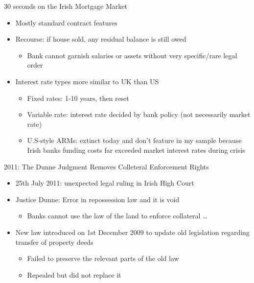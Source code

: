 \documentclass[ignorenonframetext,aspectratio=169]{beamer}
\providecommand{\tightlist}{%
  \setlength{\itemsep}{0pt}\setlength{\parskip}{0pt}}
\begin{document}
\begin{frame}{30 seconds on the Irish Mortgage Market}

\begin{itemize}
\item
  Mostly standard contract features
\item
  Recourse: if house sold, any residual balance is still owed

  \begin{itemize}
  \tightlist
  \item
    Bank cannot garnish salaries or assets without very specific/rare
    legal order
  \end{itemize}
\item
  Interest rate types more similar to UK than US

  \begin{itemize}
  \tightlist
  \item
    Fixed rates: 1-10 years, then reset
  \item
    Variable rate: interest rate decided by bank policy (not necessarily
    market rate)
  \item
    U.S-style ARMs: extinct today and don't feature in my sample because
    Irish banks funding costs far exceeded market interest rates during
    crisis
  \end{itemize}
\end{itemize}

\end{frame}

\begin{frame}{2011: The Dunne Judgment Removes Colleteral Enforcement
Rights}

\begin{itemize}
\item
  25th July 2011: unexpected legal ruling in Irish High Court
\item
  Justice Dunne: Error in repossession law and it is void

  \begin{itemize}
  \tightlist
  \item
    Banks cannot use the law of the land to enforce collateral \ldots{}
  \end{itemize}
\item
  New law introduced on 1st December 2009 to update old legislation
  regarding transfer of property deeds

  \begin{itemize}
  \tightlist
  \item
    Failed to preserve the relevant parts of the old law
  \item
    Repealed but did not replace it
  \end{itemize}
\end{itemize}

\end{frame}
\end{document}
